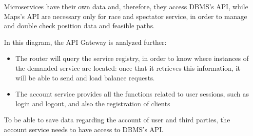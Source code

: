 Microservices have their own data and, therefore, they access DBMS's API, while Maps's API are necessary 
only for race and spectator service, in order to manage and double check position data and feasible paths.

\par 

In this diagram, the API Gateway is analyzed further:
\begin{itemize}
\item The router will query the service registry, in order to know where instances 
of the demanded service are located: once that it retrieves this information, it will be able to send and load balance requests.
\item The account service provides all the functions related to user sessions, such as login and logout,
and also the registration of clients 
\end{itemize}
To be able to save data regarding the account of user and third parties, the account service needs to have access to DBMS's API.

